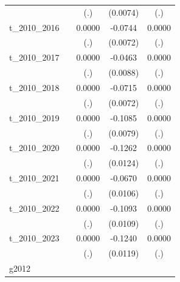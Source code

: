 \begin{table}[htbp]
\begin{tabular}{l*{4}{c}}
            &                     &         (.)         &    (0.0074)         &         (.)         \\
[1em]
t\_2010\_2016 &                     &      0.0000         &     -0.0744\sym{***}&      0.0000         \\
            &                     &         (.)         &    (0.0072)         &         (.)         \\
[1em]
t\_2010\_2017 &                     &      0.0000         &     -0.0463\sym{***}&      0.0000         \\
            &                     &         (.)         &    (0.0088)         &         (.)         \\
[1em]
t\_2010\_2018 &                     &      0.0000         &     -0.0715\sym{***}&      0.0000         \\
            &                     &         (.)         &    (0.0072)         &         (.)         \\
[1em]
t\_2010\_2019 &                     &      0.0000         &     -0.1085\sym{***}&      0.0000         \\
            &                     &         (.)         &    (0.0079)         &         (.)         \\
[1em]
t\_2010\_2020 &                     &      0.0000         &     -0.1262\sym{***}&      0.0000         \\
            &                     &         (.)         &    (0.0124)         &         (.)         \\
[1em]
t\_2010\_2021 &                     &      0.0000         &     -0.0670\sym{***}&      0.0000         \\
            &                     &         (.)         &    (0.0106)         &         (.)         \\
[1em]
t\_2010\_2022 &                     &      0.0000         &     -0.1093\sym{***}&      0.0000         \\
            &                     &         (.)         &    (0.0109)         &         (.)         \\
[1em]
t\_2010\_2023 &                     &      0.0000         &     -0.1240\sym{***}&      0.0000         \\
            &                     &         (.)         &    (0.0119)         &         (.)         \\
\hline
g2012       &                     &                     &                     &                     \\

\end{tabular}
\end{table}
